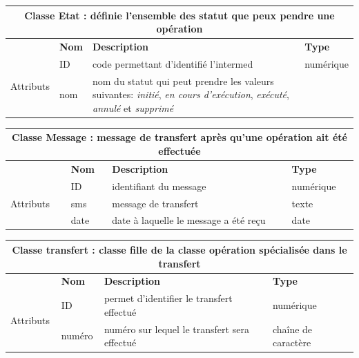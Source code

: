 		\begin{tabular}{|l|l|l|l|}
			\hline
			\multicolumn{4}{|c|}{\textbf{Classe Etat : définie l'ensemble des statut que peux pendre une opération}} \\
			
			\hline
			
			& \textbf{Nom} & \textbf{Description} & \textbf{Type} \\
			\multirow{3}{*}{Attributs} & ID & code permettant d'identifié l'intermed & numérique \\
			
			& nom & nom du statut qui peut prendre les valeurs suivantes: \textit{initié}, \textit{en cours d'exécution}, \textit{exécuté}, \textit{annulé} et \textit{supprimé}\\
			
			\hline
			
		\end{tabular}
		\label{table6}
		
		\begin{tabular}{|l|l|l|l|}
			\hline
			\multicolumn{4}{|c|}{\textbf{Classe Message : message de transfert après qu'une opération ait été effectuée}} \\
			
			\hline
			
			& \textbf{Nom} & \textbf{Description} & \textbf{Type} \\
			\multirow{3}{*}{Attributs} & ID & identifiant du message & numérique \\
			
			& sms & message de transfert &  texte\\
			
			& date & date à laquelle le message a été reçu & date \\
			
			\hline
			
		\end{tabular}
		\label{table7}
		
		\begin{tabular}{|l|l|l|l|}
			\hline
			\multicolumn{4}{|c|}{\textbf{Classe transfert : classe fille de la classe opération spécialisée dans le transfert}} \\
			
			\hline
			
			& \textbf{Nom} & \textbf{Description} & \textbf{Type} \\
			\multirow{3}{*}{Attributs} & ID & permet d'identifier le transfert effectué & numérique \\
			
			& numéro & numéro sur lequel le transfert sera effectué & chaîne de caractère\\
			
			\hline
			
		\end{tabular}
		\label{table15}
		
